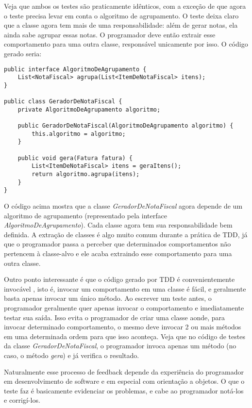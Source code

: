 Veja que ambos os testes são praticamente idênticos, com a exceção de que agora o teste precisa levar em conta o algoritmo de agrupamento. 
O teste deixa claro que a classe agora tem mais de uma responsabilidade: além de gerar notas, ela ainda sabe agrupar essas notas. O programador
deve então extrair esse comportamento para uma outra classe, responsável unicamente por isso. O código gerado seria:

\begin{lstlisting}[frame=trbl]
public interface AlgoritmoDeAgrupamento {
	List<NotaFiscal> agrupa(List<ItemDeNotaFiscal> itens);
}

public class GeradorDeNotaFiscal {
	private AlgoritmoDeAgrupamento algoritmo;
	
	public GeradorDeNotaFiscal(AlgoritmoDeAgrupamento algoritmo) {
		this.algoritmo = algoritmo;
	}
	
	public void gera(Fatura fatura) {
		List<ItemDeNotaFiscal> itens = geraItens();
		return algoritmo.agrupa(itens);
	}
}
\end{lstlisting}

O código acima mostra que a classe \textit{GeradorDeNotaFiscal} agora depende de um algoritmo de agrupamento (representado pela interface
\textit{AlgoritmoDeAgrupamento}). Cada classe agora tem sua responsabilidade bem definida. A extração de classes é algo muito comum
durante a prática de TDD, já que o programador passa a perceber que determinados comportamentos não pertencem à classe-alvo e ele
acaba extraindo esse comportamento para uma outra classe. 

Outro ponto interessante é que o código gerado por TDD é convenientemente invocável \cite{bob-martin}, isto é, invocar um comportamento em uma classe
é fácil, e geralmente basta apenas invocar um único método. Ao escrever um teste antes, o programador geralmente quer apenas invocar
o comportamento e imediatamente testar sua saída. Isso evita o programador de criar uma classe aonde, para invocar determinado comportamento,
o mesmo deve invocar 2 ou mais métodos em uma determinada ordem para que isso aconteça. 
Veja que no código de testes da classe \textit{GeradorDeNotaFiscal}, o programador
invoca apenas um método (no caso, o método \textit{gera}) e já verifica o resultado. 

Naturalmente esse processo de feedback depende da experiência do programador em desenvolvimento de software e em especial 
com orientação a objetos. O que o teste faz é basicamente evidenciar os problemas, e cabe ao programador notá-los e
corrigí-los.
 
